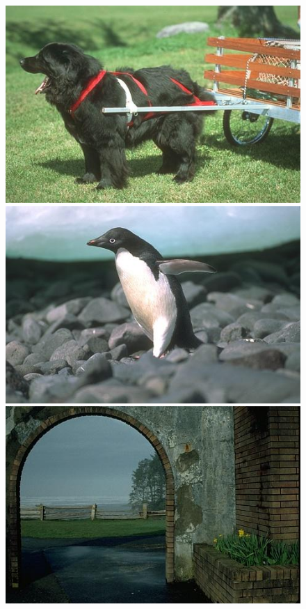 \begin{figure}[h]
{\begin{minipage}[b]{0.13\linewidth}
\includegraphics[width=1\linewidth]{figures/img/image/247012.jpg}
\includegraphics[width=1\linewidth]{figures/img/image/106005.jpg}
\includegraphics[width=1\linewidth]{figures/img/image/5096.jpg}

\end{minipage}}
\end{figure}
